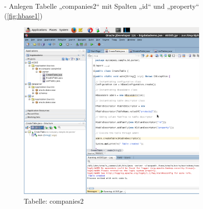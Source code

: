 \begin{itemize}
\item[-]Anlegen Tabelle „companies2“ mit Spalten „id“ und „property“ (\autoref{fig:hbase1})
\begin{figure}[!htb]
        \begin{minipage}{1\textwidth}
                \centering
                \includegraphics[width=0.90\textwidth]{pics/hbase1.png}\par\vspace{0cm}
                \caption{Tabelle: companies2}
                \label{fig:hbase1}
        \end{minipage}
\end{figure}


\end{itemize}
